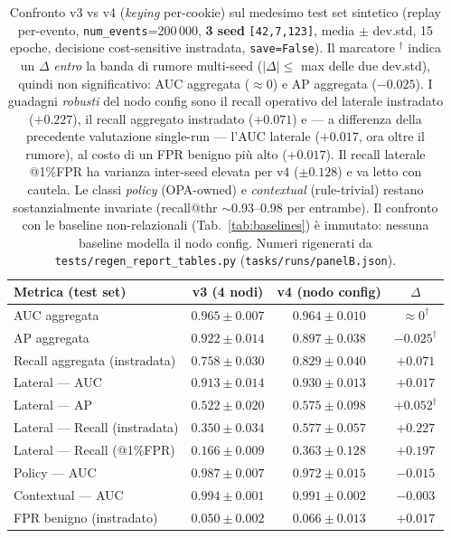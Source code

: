 \documentclass[11pt,a4paper]{report}
\begin{document}
\begin{table}[ht!]
\centering
\footnotesize
\renewcommand{\arraystretch}{1.4}
\setlength{\tabcolsep}{5pt}
\begin{tabular}{l c c c}
\hline
\textbf{Metrica (test set)} & \textbf{v3 (4 nodi)} & \textbf{v4 (nodo config)} & $\Delta$ \\
\hline
AUC aggregata                    & $\mathbf{0.965}\pm0.007$ & $0.964\pm0.010$ & $\approx\!0^{\dagger}$ \\
AP aggregata                     & $\mathbf{0.922}\pm0.014$ & $0.897\pm0.038$ & $-0.025^{\dagger}$ \\
Recall aggregata (instradata)    & $0.758\pm0.030$ & $\mathbf{0.829}\pm0.040$ & $+0.071$ \\
\hline
Lateral --- AUC                  & $0.913\pm0.014$ & $\mathbf{0.930}\pm0.013$ & $+0.017$ \\
Lateral --- AP                   & $0.522\pm0.020$ & $\mathbf{0.575}\pm0.098$ & $+0.052^{\dagger}$ \\
Lateral --- Recall (instradata)  & $0.350\pm0.034$ & $\mathbf{0.577}\pm0.057$ & $+0.227$ \\
Lateral --- Recall (@1\%FPR)     & $0.166\pm0.009$ & $\mathbf{0.363}\pm0.128$ & $+0.197$ \\
\hline
Policy --- AUC                   & $\mathbf{0.987}\pm0.007$ & $0.972\pm0.015$ & $-0.015$ \\
Contextual --- AUC               & $\mathbf{0.994}\pm0.001$ & $0.991\pm0.002$ & $-0.003$ \\
\hline
FPR benigno (instradato)         & $\mathbf{0.050}\pm0.002$ & $0.066\pm0.013$ & $+0.017$ \\
\hline
\end{tabular}
\caption{Confronto v3 vs v4 (\textit{keying} per-cookie) sul medesimo test set sintetico (replay per-evento, \texttt{num\_events}=200\,000, \textbf{3 seed} \texttt{[42,7,123]}, media $\pm$ dev.std, 15 epoche, decisione cost-sensitive instradata, \texttt{save=False}). Il marcatore $^{\dagger}$ indica un $\Delta$ \emph{entro} la banda di rumore multi-seed ($|\Delta|\le$ max delle due dev.std), quindi non significativo: AUC aggregata ($\approx\!0$) e AP aggregata ($-0.025$). I guadagni \emph{robusti} del nodo config sono il recall operativo del laterale instradato ($+0.227$), il recall aggregato instradato ($+0.071$) e --- a differenza della precedente valutazione single-run --- l'AUC laterale ($+0.017$, ora oltre il rumore), al costo di un FPR benigno più alto ($+0.017$). Il recall laterale @1\%FPR ha varianza inter-seed elevata per v4 ($\pm0.128$) e va letto con cautela. Le classi \textit{policy} (OPA-owned) e \textit{contextual} (rule-trivial) restano sostanzialmente invariate (recall@thr $\sim$0.93--0.98 per entrambe). Il confronto con le baseline non-relazionali (Tab.~\ref{tab:baselines}) è immutato: nessuna baseline modella il nodo config. Numeri rigenerati da \texttt{tests/regen\_report\_tables.py} (\texttt{tasks/runs/panelB.json}).}
\label{tab:v3v4}
\end{table}
\end{document}
